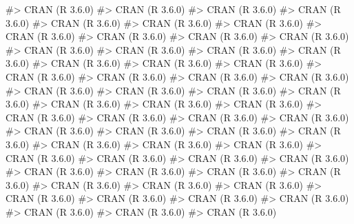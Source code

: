 \documentclass[
]{jss}
\begin{document}
\begin{CodeChunk}
\begin{CodeOutput}
#>  CRAN (R 3.6.0)                          
#>  CRAN (R 3.6.0)                          
#>  CRAN (R 3.6.0)                          
#>  CRAN (R 3.6.0)                          
#>  CRAN (R 3.6.0)                          
#>  CRAN (R 3.6.0)                          
#>  CRAN (R 3.6.0)                          
#>  CRAN (R 3.6.0)                          
#>  CRAN (R 3.6.0)                          
#>  CRAN (R 3.6.0)                          
#>  CRAN (R 3.6.0)                          
#>  CRAN (R 3.6.0)                          
#>  CRAN (R 3.6.0)                          
#>  CRAN (R 3.6.0)                          
#>  CRAN (R 3.6.0)                          
#>  CRAN (R 3.6.0)                          
#>  CRAN (R 3.6.0)                          
#>  CRAN (R 3.6.0)                          
#>  CRAN (R 3.6.0)                          
#>  CRAN (R 3.6.0)                          
#>  CRAN (R 3.6.0)                          
#>  CRAN (R 3.6.0)                          
#>  CRAN (R 3.6.0)                          
#>  CRAN (R 3.6.0)                          
#>  CRAN (R 3.6.0)                          
#>  CRAN (R 3.6.0)                          
#>  CRAN (R 3.6.0)                          
#>  CRAN (R 3.6.0)                          
#>  CRAN (R 3.6.0)                          
#>  CRAN (R 3.6.0)                          
#>  CRAN (R 3.6.0)                          
#>  CRAN (R 3.6.0)                          
#>  CRAN (R 3.6.0)                          
#>  CRAN (R 3.6.0)                          
#>  CRAN (R 3.6.0)                          
#>  CRAN (R 3.6.0)                          
#>  CRAN (R 3.6.0)                          
#>  CRAN (R 3.6.0)                          
#>  CRAN (R 3.6.0)                          
#>  CRAN (R 3.6.0)                          
#>  CRAN (R 3.6.0)                          
#>  CRAN (R 3.6.0)                          
#>  CRAN (R 3.6.0)                          
#>  CRAN (R 3.6.0)                          
#>  CRAN (R 3.6.0)                          
#>  CRAN (R 3.6.0)                          
#>  CRAN (R 3.6.0)                          
#>  CRAN (R 3.6.0)                          
#>  CRAN (R 3.6.0)                          
#>  CRAN (R 3.6.0)                          
#>  CRAN (R 3.6.0)                          
#>  CRAN (R 3.6.0)                          
#>  CRAN (R 3.6.0)                          
#>  CRAN (R 3.6.0)                          
#>  CRAN (R 3.6.0)                          
#>  CRAN (R 3.6.0)                          
#>  CRAN (R 3.6.0)                          
#>  CRAN (R 3.6.0)                          

\end{CodeOutput}
\end{CodeChunk}
\end{document}
